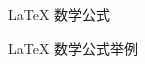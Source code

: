 \documentclass[10pt,aspectratio=43,mathserif]{beamer}
\begin{document}
\begin{frame}[fragile]{\LaTeX{} 数学公式}


\end{frame}

\begin{frame}{\LaTeX{} 数学公式举例}
\end{frame}
\end{document}
